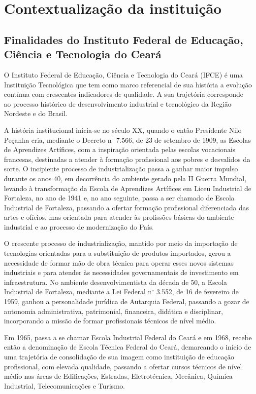 \chapter{Contextualização da instituição}

\section{Finalidades do Instituto Federal de Educação, Ciência e Tecnologia do Ceará}


O Instituto Federal de Educação, Ciência e Tecnologia do Ceará (IFCE) é uma Instituição Tecnológica que tem como marco referencial de sua história a evolução contínua com crescentes indicadores de qualidade. A sua trajetória corresponde ao processo histórico de desenvolvimento industrial e tecnológico da Região Nordeste e do Brasil.

A história institucional inicia-se no século XX, quando o então Presidente Nilo Peçanha cria, mediante o Decreto n$^\circ$  7.566, de 23 de setembro de 1909, as Escolas de Aprendizes Artífices, com a inspiração orientada pelas escolas vocacionais francesas, destinadas a atender à formação profissional aos pobres e desvalidos da sorte. O incipiente processo de industrialização passa a ganhar maior impulso durante os anos 40, em decorrência do ambiente gerado pela II Guerra Mundial, levando à transformação da Escola de Aprendizes Artífices em Liceu Industrial de Fortaleza, no ano de 1941 e, no ano seguinte, passa a ser chamado de Escola Industrial de Fortaleza, passando a ofertar formação profissional diferenciada das artes e ofícios, mas orientada para atender às profissões básicas do ambiente industrial e ao processo de modernização do País.

O crescente processo de industrialização, mantido por meio da importação de tecnologias orientadas para a substituição de produtos importados, gerou a necessidade de formar mão de obra técnica para operar esses novos sistemas industriais e para atender às necessidades governamentais de investimento em infraestrutura. No ambiente desenvolvimentista da década de 50, a Escola Industrial de Fortaleza, mediante a Lei Federal n$^\circ$ 3.552, de 16 de fevereiro de 1959, ganhou a personalidade jurídica de Autarquia Federal, passando a gozar de autonomia administrativa, patrimonial, financeira, didática e disciplinar, incorporando a missão de formar profissionais técnicos de nível médio.

Em 1965, passa a se chamar Escola Industrial Federal do Ceará e em 1968, recebe então a denominação de Escola Técnica Federal do Ceará, demarcando o início de uma trajetória de consolidação de sua imagem como instituição de educação profissional, com elevada qualidade, passando a ofertar cursos técnicos de nível médio nas áreas de Edificações, Estradas, Eletrotécnica, Mecânica, Química Industrial, Telecomunicações e Turismo.



